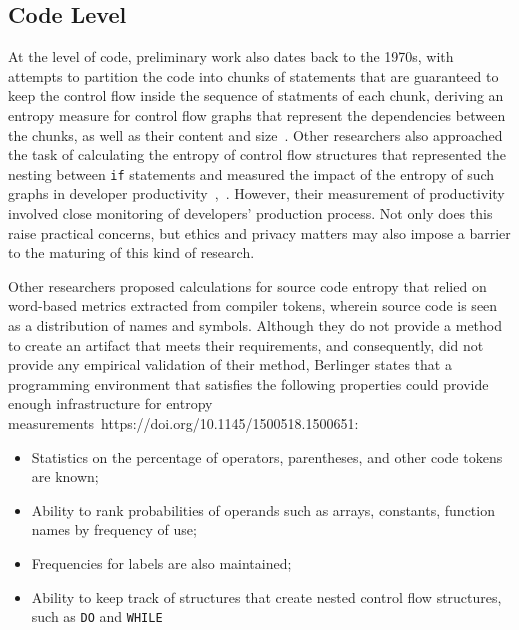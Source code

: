 \documentclass[10pt,conference]{IEEEtran}
\begin{document}
\subsection{Code Level} \label{code_level}
At the level of code, preliminary work also dates back to the 1970s, with attempts to partition the code into chunks of statements that are guaranteed to keep the control flow inside the sequence of statments of each chunk, deriving an entropy measure for control flow graphs that represent the dependencies between the chunks, as well as their content and size~\cite{davi88complexity}. Other researchers also approached the task of calculating the entropy of control flow structures that represented the nesting between \texttt{if} statements and measured the impact of the entropy of such graphs in developer productivity~\cite{chen1978complexity},~\cite{khoshgoftaar1998information}. However, their measurement of productivity involved close monitoring of developers' production process. Not only does this raise practical concerns, but ethics and privacy matters may also impose a barrier to the maturing of this kind of research.

Other researchers proposed calculations for source code entropy that relied on word-based metrics extracted from compiler tokens, wherein source code is seen as a distribution of names and symbols. Although they do not provide a method to create an artifact that meets their requirements, and consequently, did not provide any empirical validation of their method, Berlinger states that a programming environment that satisfies the following properties could provide enough infrastructure for entropy measurements~https://doi.org/10.1145/1500518.1500651:
\begin{itemize}
    \item Statistics on the percentage of operators, parentheses, and other code tokens are known;
    \item Ability to rank probabilities of operands such as arrays, constants, function names by frequency of use;
    \item Frequencies for labels are also maintained;
    \item Ability to keep track of structures that create nested control flow structures, such as \texttt{DO} and \texttt{WHILE}
\end{itemize}
\end{document}
